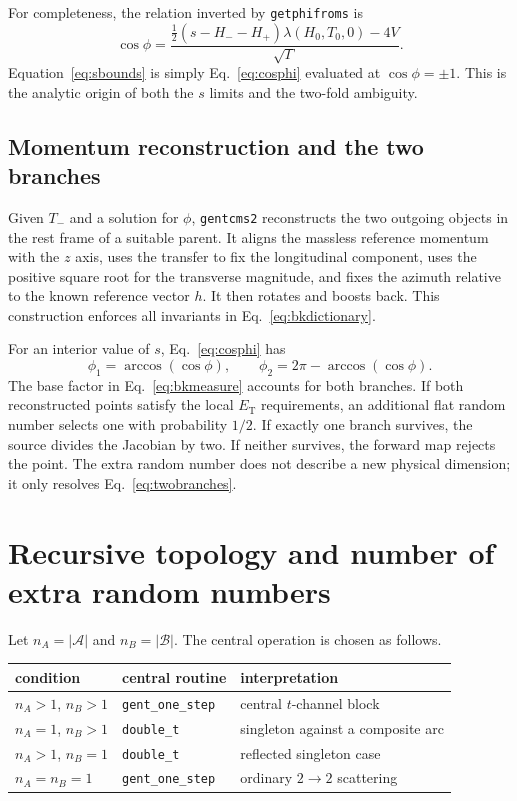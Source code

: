 \documentclass[11pt,a4paper]{article}
\newcommand{\code}[1]{\texttt{#1}}
\newcommand{\lam}{\lambda}
\newcommand{\ET}{E_{\mathrm{T}}}
\newcommand{\mc}[1]{\mathcal{#1}}
\begin{document}
For completeness, the relation inverted by \code{getphifroms} is
\begin{equation}
 \cos\phi=
 \frac{\tfrac12(s-H_--H_+)\lam(H_0,T_0,0)-4V}{\sqrt\Gamma}.
 \label{eq:cosphi}
\end{equation}
Equation~\eqref{eq:sbounds} is simply Eq.~\eqref{eq:cosphi} evaluated at
$\cos\phi=\pm1$.  This is the analytic origin of both the $s$ limits and the
two-fold ambiguity.

\subsection{Momentum reconstruction and the two branches}

Given $T_-$ and a solution for $\phi$, \code{gentcms2} reconstructs the two
outgoing objects in the rest frame of a suitable parent.  It aligns the
massless reference momentum with the $z$ axis, uses the transfer to fix the
longitudinal component, uses the positive square root for the transverse
magnitude, and fixes the azimuth relative to the known reference vector $h$.
It then rotates and boosts back.  This construction enforces all invariants in
Eq.~\eqref{eq:bkdictionary}.

For an interior value of $s$, Eq.~\eqref{eq:cosphi} has
\begin{equation}
 \phi_1=\arccos(\cos\phi),\qquad
 \phi_2=2\pi-\arccos(\cos\phi).
 \label{eq:twobranches}
\end{equation}
The base factor in Eq.~\eqref{eq:bkmeasure} accounts for both branches.  If
both reconstructed points satisfy the local $\ET$ requirements, an additional
flat random number selects one with probability $1/2$.  If exactly one branch
survives, the source divides the Jacobian by two.  If neither survives, the
forward map rejects the point.  The extra random number does not describe a
new physical dimension; it only resolves Eq.~\eqref{eq:twobranches}.

\section{Recursive topology and number of extra random numbers}

Let $n_A=|\mc A|$ and $n_B=|\mc B|$.  The central operation is chosen as
follows.

\begin{center}
\begin{tabular}{lll}
\toprule
condition & central routine & interpretation\\
\midrule
$n_A>1$, $n_B>1$ & \code{gent\_one\_step} & central $t$-channel block\\
$n_A=1$, $n_B>1$ & \code{double\_t} & singleton against a composite arc\\
$n_A>1$, $n_B=1$ & \code{double\_t} & reflected singleton case\\
$n_A=n_B=1$ & \code{gent\_one\_step} & ordinary $2\to2$ scattering\\
\bottomrule
\end{tabular}
\end{center}
\end{document}
